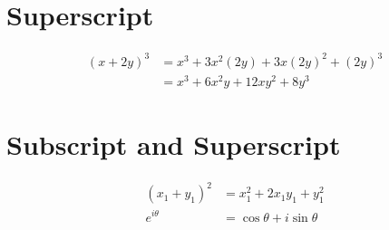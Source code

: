 \documentclass[14pt]{extarticle}
\begin{document}
\section{Superscript}

\begin{align}
(x + 2y)^3 &= x^3 + 3x^2(2y) + 3x(2y)^2 +(2y)^3\\
           &= x^3 + 6x^2y + 12xy^2 +8y^3
\end{align}

\section{Subscript and Superscript}

\begin{align}
(x_1 + y_1)^2 &= x_1^2 + 2x_1y_1 + y_1^2\\
e^{i\theta}&=\cos \theta + i\sin \theta
\end{align}
\end{document}
